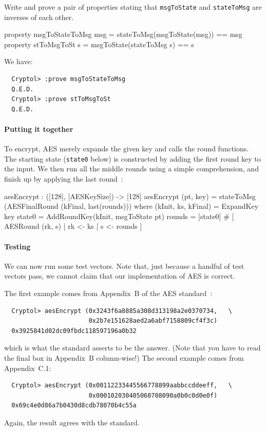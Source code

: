 \begin{Exercise}\label{ex:aes:enc0}
  Write and prove a pair of properties stating that {\tt msgToState}
  and {\tt stateToMsg} are inverses of each other.
\end{Exercise}
\begin{Answer}
\begin{code}
  property msgToStateToMsg msg = stateToMsg(msgToState(msg)) == msg
  property stToMsgToSt s = msgToState(stateToMsg s) == s
\end{code}
We have:
\begin{Verbatim}
  Cryptol> :prove msgToStateToMsg
  Q.E.D.
  Cryptol> :prove stToMsgToSt
  Q.E.D.
\end{Verbatim}
\end{Answer}

\paragraph*{Putting it together} To encrypt, AES merely expands the
given key and calls the round functions. The starting state (\texttt{state0}
below) is constructed by adding the first round key to the
input. We then run all the middle rounds using a simple comprehension,
and finish up by applying the last round~\cite[figure 5, section
5.1]{aes}:\indRIndex
\begin{code}
  aesEncrypt : ([128], [AESKeySize]) -> [128]
  aesEncrypt (pt, key) = stateToMsg (AESFinalRound (kFinal, last(rounds)))
    where   (kInit, ks, kFinal) = ExpandKey key
            state0 = AddRoundKey(kInit, msgToState pt)
            rounds = [state0] # [ AESRound (rk, s) | rk <- ks
                                                   | s <- rounds
                                ]
\end{code}

\paragraph*{Testing} We can now run some test vectors. Note that, just
because a handful of test vectors pass, we cannot claim that our
implementation of AES is correct.

The first example comes from Appendix~B of the AES\indAES
standard~\cite{aes}:
\begin{Verbatim}
  Cryptol> aesEncrypt (0x3243f6a8885a308d313198a2e0370734,   \
                       0x2b7e151628aed2a6abf7158809cf4f3c)
  0x3925841d02dc09fbdc118597196a0b32
\end{Verbatim}
which is what the standard asserts to be the answer. (Note that you
have to read the final box in Appendix~B column-wise!)  The second
example comes from Appendix~C.1:
\begin{Verbatim}
  Cryptol> aesEncrypt (0x00112233445566778899aabbccddeeff,   \
                       0x000102030405060708090a0b0c0d0e0f)
  0x69c4e0d86a7b0430d8cdb78070b4c55a
\end{Verbatim}
Again, the result agrees with the standard.

